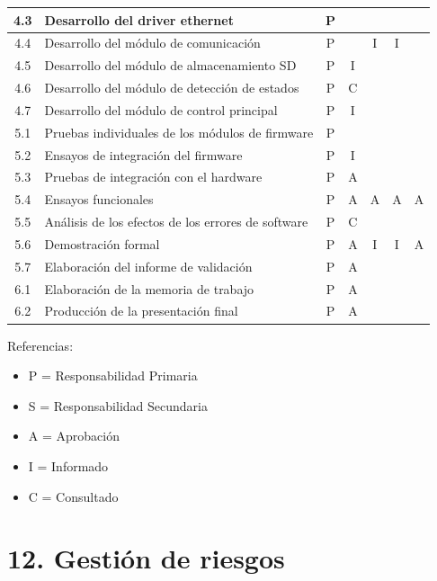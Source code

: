 \documentclass[11pt]{charter}
\begin{document}
\begin{table}[htpb]
{\begin{tabular}{|c|m{6cm}|c|c|c|c|c|}
 4.3 & Desarrollo del driver ethernet & P & & & & \\ \hline
 4.4 & Desarrollo del módulo de comunicación & P & & I & I & \\ \hline
 4.5 & Desarrollo del módulo de almacenamiento SD & P & I & & & \\ \hline
 4.6 & Desarrollo del módulo de detección de estados & P & C & & & \\ \hline
 4.7 & Desarrollo del módulo de control principal & P & I & & & \\ \hline
 5.1 & Pruebas individuales de los módulos de firmware & P & & & & \\ \hline
 5.2 & Ensayos de integración del firmware & P & I & & & \\ \hline
 5.3 & Pruebas de integración con el hardware & P & A & & & \\ \hline
 5.4 & Ensayos funcionales & P & A & A & A & A \\ \hline
 5.5 & Análisis de los efectos de los errores de software & P & C & & & \\ \hline
 5.6 & Demostración formal & P & A & I & I & A \\ \hline
 5.7 & Elaboración del informe de validación & P & A & & & \\ \hline 
 6.1 & Elaboración de la memoria de trabajo & P & A & & & \\ \hline 
 6.2 & Producción de la presentación final & P & A & & & \\ \hline 
\end{tabular}%
}
\end{table}

{\footnotesize
Referencias:
\begin{itemize}
	\item P = Responsabilidad Primaria
	\item S = Responsabilidad Secundaria
	\item A = Aprobación
	\item I = Informado
	\item C = Consultado
\end{itemize}
} %

\section{12. Gestión de riesgos}
\label{sec:riesgos}
\end{document}
